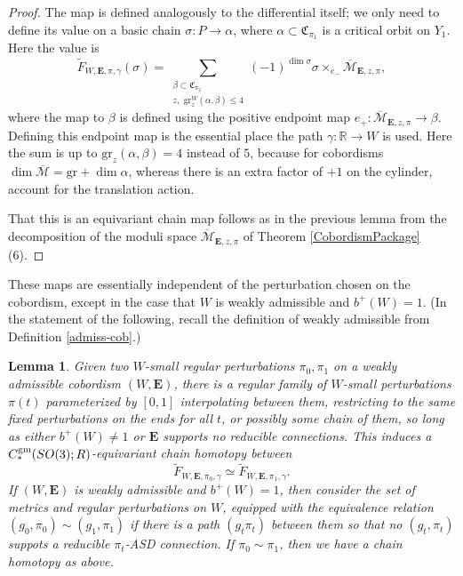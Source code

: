 \documentclass{memo-l}
\newtheorem{lemma}[theorem]{Lemma}
\theoremstyle{definition}
\theoremstyle{remark}
\numberwithin{section}{chapter}
\numberwithin{equation}{chapter}
\begin{document}
\begin{proof}
The map is defined analogously to the differential itself; we only need to define its value on a basic chain $\sigma: P \to \alpha$, where $\alpha \subset \mathfrak C_{\pi_1}$ is a critical orbit on $Y_1$. Here the value is $$\widetilde F_{W,\mathbf{E},\pi,\gamma}\left(\sigma\right) = \sum_{\substack{\beta \subset \mathfrak C_{\pi_2}\\ z, \text{ gr}^W_z(\alpha, \beta) \leq 4}} (-1)^{\dim \sigma} \sigma \times_{e_-} \overline{\mathcal M}_{\mathbf{E}, z, \pi},$$ where the map to $\beta$ is defined using the positive endpoint map $e_+: \overline{\mathcal M}_{\mathbf{E}, z, \pi} \to \beta$. Defining this endpoint map is the essential place the path $\gamma: \mathbb R \to W$ is used. Here the sum is up to $\text{gr}_z(\alpha, \beta) = 4$ instead of $5$, because for cobordisms $\dim \overline{\mathcal M} = \text{gr} + \dim \alpha$, whereas there is an extra factor of $+1$ on the cylinder, account for the translation action.

That this is an equivariant chain map follows as in the previous lemma from the decomposition of the moduli space $\overline{\mathcal M}_{\mathbf{E}, z, \pi}$ of Theorem \ref{CobordismPackage} (6).
\end{proof}

These maps are essentially independent of the perturbation chosen on the cobordism, except in the case that $W$ is weakly admissible and $b^+(W) = 1$. (In the statement of the following, recall the definition of weakly admissible from Definition \ref{admiss-cob}.)

\begin{lemma}\label{invariance}Given two $W$-small regular perturbations $\pi_0, \pi_1$ on a weakly admissible cobordism $(W, \mathbf{E})$, there is a regular family of $W$-small perturbations $\pi(t)$ parameterized by $[0,1]$ interpolating between them, restricting to the same fixed perturbations on the ends for all $t$, or possibly some chain of them, so long as either $b^+(W) \neq 1$ or $\mathbf{E}$ supports no reducible connections. This induces a $C_*^{\textup{gm}}(SO(3);R)$-equivariant chain homotopy between
$$\widetilde F_{W,\mathbf{E}, \pi_0, \gamma} \simeq \widetilde F_{W,\mathbf{E}, \pi_1, \gamma}.$$
If $(W,\mathbf{E})$ is weakly admissible and $b^+(W) = 1$, then consider the set of metrics and regular perturbations on $W$, equipped with the equivalence relation $(g_0, \pi_0) \sim (g_1, \pi_1)$ if there is a path $(g_t\pi_t)$ between them so that no $(g_t,\pi_t)$ suppots a reducible $\pi_t$-ASD connection. If $\pi_0 \sim \pi_1$, then we have a chain homotopy as above.
\end{lemma}
\end{document}
